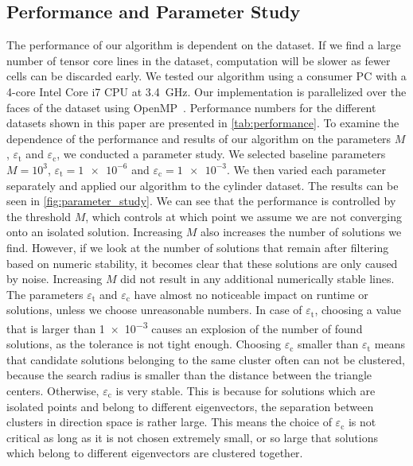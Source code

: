 \subsection{Performance and Parameter Study} %
\label{sub:performance}
%
The performance of our algorithm is dependent on the dataset.
%
If we find a large number of tensor core lines in the dataset, computation
will be slower as fewer cells can be discarded early.
%
We tested our algorithm using a consumer PC with a 4-core Intel Core i7 \ac{CPU}
at \SI{3.4}{\giga\hertz}.
%
Our implementation is parallelized over the faces of the dataset using
OpenMP~\cite{OMP2013}.
%
Performance numbers for the different datasets shown in this paper are presented
in \cref{tab:performance}.
%
To examine the dependence of the performance and results of our algorithm on the
parameters $M$, $\varepsilon_{\mathrm{t}}$ and $\varepsilon_{\mathrm{c}}$, we
conducted a parameter study.
%
We selected baseline parameters $M = 10^3$, $\varepsilon_{\mathrm{t}} =
\num{1e-6}$ and $\varepsilon_{\mathrm{c}} = \num{1e-3}$.
%
We then varied each parameter separately and applied our algorithm to the
cylinder dataset.
%
The results can be seen in \cref{fig:parameter_study}.
%
We can see that the performance is controlled by the threshold $M$, which
controls at which point we assume we are not converging onto an isolated
solution.
%
Increasing $M$ also increases the number of solutions we find.
%
However, if we look at the number of solutions that remain after filtering based
on numeric stability, it becomes clear that these solutions are only caused by
noise.
%
Increasing $M$ did not result in any additional numerically stable lines.
%
The parameters $\varepsilon_{\mathrm{t}}$ and $\varepsilon_{\mathrm{c}}$ have
almost no noticeable impact on runtime or solutions, unless we choose
unreasonable numbers.
%
In case of $\varepsilon_{\mathrm{t}}$, choosing a value that is larger than
\num{1e-3} causes an explosion of the number of found solutions, as the
tolerance is not tight enough.
%
Choosing $\varepsilon_{\mathrm{c}}$ smaller than $\varepsilon_{\mathrm{t}}$
means that candidate solutions belonging to the same cluster often can not be
clustered, because the search radius is smaller than the distance between the
triangle centers.
%
Otherwise, $\varepsilon_{\mathrm{c}}$ is very stable.
%
This is because for solutions which are isolated points and belong to different
eigenvectors, the separation between clusters in direction space is rather
large.
This means the choice of $\varepsilon_{\mathrm{c}}$ is not critical as
long as it is not chosen extremely small, or so large that solutions
which belong to different eigenvectors are clustered together.

